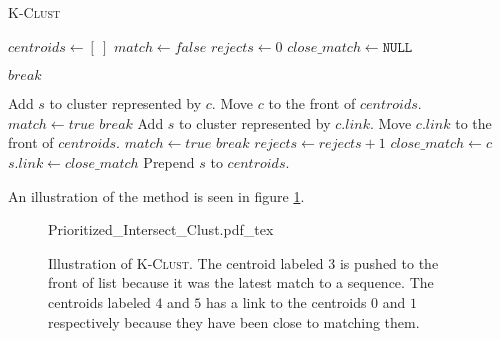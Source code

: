 \begin{algorithm}[H]
  \caption{\textsc{K-Clust}}
  \label{alg:k-clust}
  \begin{algorithmic}[1]
    \Statex
      \State $centroids \gets [~]$ 
        \State $match \gets false$
        \State $rejects \gets 0$
        \State $close\_match \gets \mathtt{NULL}$

            \State $break$
          \EndIf

          \State
              \State Add $s$ to cluster represented by $c$.
              \State Move $c$ to the front of $centroids$.
              \State $match \gets true$
              \State $break$
            \EndIf
            \State
              \State Add $s$ to cluster represented by $c.link$.
              \State Move $c.link$ to the front of $centroids$.
              \State $match \gets true$
              \State $break$
            \EndIf
            \State $rejects \gets rejects + 1$
            \State $close\_match \gets c$
          \EndIf
        \EndFor
        \State
          
            \State $s.link \gets close\_match$
          \EndIf
          \State Prepend $s$ to $centroids$.
        \EndIf
      \EndFor
    \EndFunction
  \end{algorithmic}
\end{algorithm}

An illustration of the method is seen in figure \ref{fig:k-clust}.

\begin{figure}[h!]
  \def\svgwidth{\columnwidth}
  {Prioritized_Intersect_Clust.pdf_tex}
  \caption{Illustration of \textsc{K-Clust}. The centroid labeled
    $3$ is pushed to the front of list because it was the latest match to a
    sequence. The centroids labeled $4$ and $5$ has a link to the centroids $0$
    and $1$ respectively because they have been close to matching them.}
  \label{fig:k-clust}
\end{figure}


